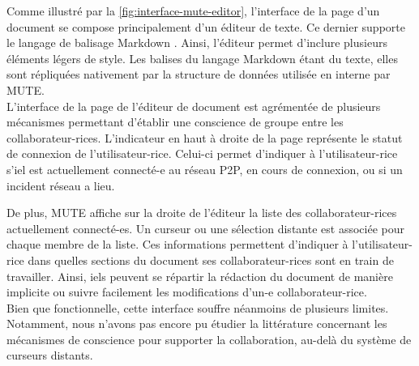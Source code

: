 Comme illustré par la \autoref{fig:interface-mute-editor}, l'interface de la page d'un document se compose principalement d'un éditeur de texte.
Ce dernier supporte le langage de balisage Markdown \cite{2004-markdown}.
Ainsi, l'éditeur permet d'inclure plusieurs éléments légers de style.
Les balises du langage Markdown étant du texte, elles sont répliquées nativement par la structure de données utilisée en interne par MUTE.\\

L'interface de la page de l'éditeur de document est agrémentée de plusieurs mécanismes permettant d'établir une conscience de groupe entre les collaborateur-rices.
L'indicateur en haut à droite de la page représente le statut de connexion de l'utilisateur-rice.
Celui-ci permet d'indiquer à l'utilisateur-rice s'iel est actuellement connecté-e au réseau \ac{P2P}, en cours de connexion, ou si un incident réseau a lieu.

De plus, \ac{MUTE} affiche sur la droite de l'éditeur la liste des collaborateur-rices actuellement connecté-es.
Un curseur ou une sélection distante est associée pour chaque membre de la liste.
Ces informations permettent d'indiquer à l'utilisateur-rice dans quelles sections du document ses collaborateur-rices sont en train de travailler.
Ainsi, iels peuvent se répartir la rédaction du document de manière implicite ou suivre facilement les modifications d'un-e collaborateur-rice.\\

Bien que fonctionnelle, cette interface souffre néanmoins de plusieurs limites.
Notamment, nous n'avons pas encore pu étudier la littérature concernant les mécanismes de conscience pour supporter la collaboration, au-delà du système de curseurs distants.

